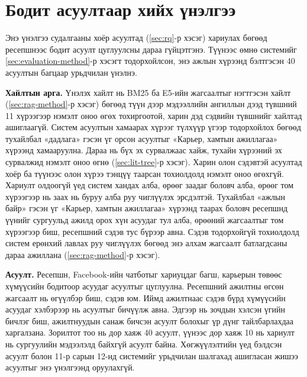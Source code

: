\section{Бодит асуултаар хийх үнэлгээ}
\label{sec:exp-tree}

Энэ үнэлгээ судалгааны хоёр асуултад (\ref{sec:rq}-р хэсэг) хариулах бөгөөд ресепшнээс бодит асуулт цуглуулсны дараа гүйцэтгэнэ. Түүнээс өмнө системийг \ref{sec:evaluation-method}-р хэсэгт тодорхойлсон, энэ ажлын хүрээнд бэлтгэсэн 40 асуултын багцаар урьдчилан үнэлнэ.

\textbf{Хайлтын арга.} Үнэлэх хайлт нь BM25 ба E5-ийн жагсаалтыг нэгтгэсэн хайлт (\ref{sec:rag-method}-р хэсэг) бөгөөд түүн дээр мэдээллийн ангиллын дээд түвшний 11 хүрээгээр нэмэлт оноо өгөх тохиргоотой, харин дэд сэдвийн түвшнийг хайлтад ашиглаагүй. Систем асуултын хамаарах хүрээг түлхүүр үгээр тодорхойлох бөгөөд тухайлбал «дадлага» гэсэн үг орсон асуултыг «Карьер, хамтын ажиллагаа» хүрээнд хамааруулна. Дараа нь бүх эх сурвалжаас хайж, тухайн хүрээний эх сурвалжид нэмэлт оноо өгнө (\ref{sec:lit-tree}-р хэсэг). Харин олон сэдэвтэй асуултад хоёр ба түүнээс олон хүрээ тэнцүү таарсан тохиолдолд нэмэлт оноо өгөхгүй. Хариулт олдоогүй үед систем хандах алба, өрөөг заадаг боловч алба, өрөөг том хүрээгээр нь заах нь буруу алба руу чиглүүлэх эрсдэлтэй. Тухайлбал «ажлын байр» гэсэн үг «Карьер, хамтын ажиллагаа» хүрээнд таарах боловч ресепшнд үүнийг сургуульд ажилд орох хүн асуудаг тул алба, өрөөний жагсаалтыг том хүрээгээр биш, ресепшний сэдэв тус бүрээр авна. Сэдэв тодорхойгүй тохиолдолд систем ерөнхий лавлах руу чиглүүлэх бөгөөд энэ алхам жагсаалт батлагдсаны дараа ажиллана (\ref{sec:rag-method}-р хэсэг).

\textbf{Асуулт.} Ресепшн, Facebook-ийн чатботыг хариуцдаг багш, карьерын төвөөс хүмүүсийн бодитоор асуудаг асуултыг цуглуулна. Ресепшний ажилтны өгсөн жагсаалт нь өгүүлбэр биш, сэдэв юм. Иймд ажилтнаас сэдэв бүрд хүмүүсийн асуудаг хэлбэрээр нь асуултыг бичүүлж авна. Эдгээр нь зочдын хэлсэн үгийн бичлэг биш, ажилтнуудын санаж бичсэн асуулт болохыг үр дүнг тайлбарлахдаа харгалзана. Зорилтот тоо нь дор хаяж 40 асуулт, үүнээс дор хаяж 10 нь хариулт нь сургуулийн мэдээлэлд байхгүй асуулт байна. Хөгжүүлэлтийн үед бэлдсэн асуулт болон 11-р сарын 12-нд системийг урьдчилан шалгахад ашигласан жишээ асуултыг энэ үнэлгээнд оруулахгүй.

